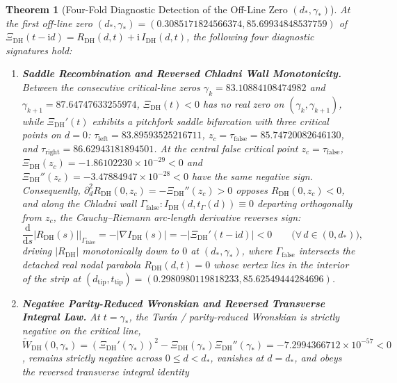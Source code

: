 \documentclass[11pt,reqno]{amsart}
\newtheorem{theorem}{Theorem}[section]
\theoremstyle{definition}
\theoremstyle{remark}
\numberwithin{equation}{section}
\newcommand{\dd}{\mathrm{d}}
\newcommand{\ii}{\mathrm{i}}
\newcommand{\DHf}{\mathrm{DH}}
\begin{document}
\begin{theorem}[Four-Fold Diagnostic Detection of the Off-Line Zero $(d_*, \gamma_*)$]\label{thm:fourfold_diagnostics}
At the first off-line zero $(d_*, \gamma_*) = (0.3085171824566374, 85.69934848537759)$ of $\Xi_{\DHf}(t - \ii d) = R_{\DHf}(d,t) + \ii\,I_{\DHf}(d,t)$, the following four diagnostic signatures hold:
\begin{enumerate}[label=\textup{(\roman*)},leftmargin=2.2em]
\item \textbf{Saddle Recombination and Reversed Chladni Wall Monotonicity.} Between the consecutive critical-line zeros $\gamma_k = 83.10884108474982$ and $\gamma_{k+1} = 87.64747633255974$, $\Xi_{\DHf}(t) < 0$ has no real zero on $(\gamma_k, \gamma_{k+1})$, while $\Xi_{\DHf}'(t)$ exhibits a pitchfork saddle bifurcation with three critical points on $d = 0$: $\tau_{\mathrm{left}} = 83.89593525216711$, $z_c = \tau_{\mathrm{false}} = 85.74720082646130$, and $\tau_{\mathrm{right}} = 86.62943181894501$. At the central false critical point $z_c = \tau_{\mathrm{false}}$, $\Xi_{\DHf}(z_c) = -1.86102230 \times 10^{-29} < 0$ and $\Xi_{\DHf}''(z_c) = -3.47884947 \times 10^{-28} < 0$ have the \emph{same negative sign}. Consequently, $\partial_d^2 R_{\DHf}(0, z_c) = -\Xi_{\DHf}''(z_c) > 0$ opposes $R_{\DHf}(0, z_c) < 0$, and along the Chladni wall $\Gamma_{\mathrm{false}} : I_{\DHf}(d, t_\Gamma(d)) \equiv 0$ departing orthogonally from $z_c$, the Cauchy--Riemann arc-length derivative reverses sign:
\begin{equation}\label{eq:reversed_wall_monotonicity}
\frac{\dd}{\dd s}\bigl|R_{\DHf}(s)\bigr|\Big|_{\Gamma_{\mathrm{false}}} = -\bigl|\nabla I_{\DHf}(s)\bigr| = -\bigl|\Xi_{\DHf}'(t - \ii d)\bigr| < 0 \qquad \bigl(\forall\,d \in (0, d_*)\bigr),
\end{equation}
driving $|R_{\DHf}|$ monotonically down to $0$ at $(d_*, \gamma_*)$, where $\Gamma_{\mathrm{false}}$ intersects the detached real nodal parabola $R_{\DHf}(d,t) = 0$ whose vertex lies in the interior of the strip at $(d_{\mathrm{tip}}, t_{\mathrm{tip}}) = (0.2980980119818233, 85.62549444284696)$.
\item \textbf{Negative Parity-Reduced Wronskian and Reversed Transverse Integral Law.} At $t = \gamma_*$, the Tur\'an / parity-reduced Wronskian is strictly negative on the critical line, $\widetilde{W}_{\DHf}(0, \gamma_*) = (\Xi_{\DHf}'(\gamma_*))^2 - \Xi_{\DHf}(\gamma_*)\Xi_{\DHf}''(\gamma_*) = -7.2994366712 \times 10^{-57} < 0$, remains strictly negative across $0 \le d < d_*$, vanishes at $d = d_*$, and obeys the reversed transverse integral identity

\end{enumerate}
\end{theorem}
\end{document}
